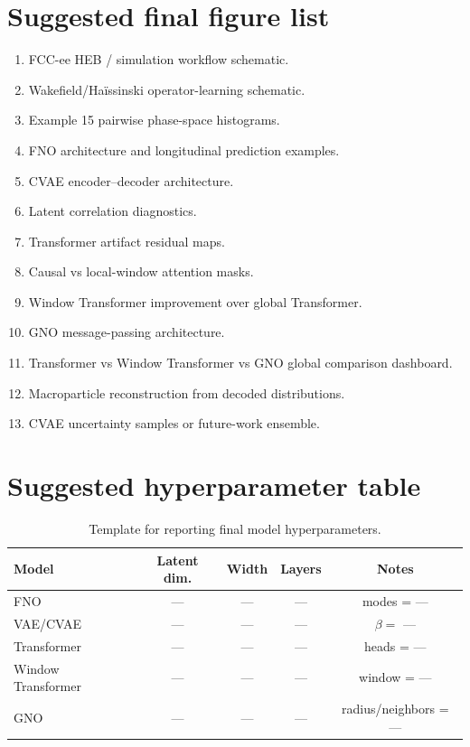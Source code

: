 \documentclass[11pt,a4paper]{article}
\begin{document}
\begin{sloppypar}
\section{Suggested final figure list}
\begin{enumerate}[label=Fig.~\arabic*:, leftmargin=2.2cm]
    \item FCC-ee HEB / simulation workflow schematic.
    \item Wakefield/Ha\"issinski operator-learning schematic.
    \item Example 15 pairwise phase-space histograms.
    \item FNO architecture and longitudinal prediction examples.
    \item CVAE encoder--decoder architecture.
    \item Latent correlation diagnostics.
    \item Transformer artifact residual maps.
    \item Causal vs local-window attention masks.
    \item Window Transformer improvement over global Transformer.
    \item GNO message-passing architecture.
    \item Transformer vs Window Transformer vs GNO global comparison dashboard.
    \item Macroparticle reconstruction from decoded distributions.
    \item CVAE uncertainty samples or future-work ensemble.
\end{enumerate}

\section{Suggested hyperparameter table}
\begin{table}[H]
\centering
\caption{Template for reporting final model hyperparameters.}
\label{tab:hyperparameters_appendix}
\begin{tabular}{lcccc}
\toprule
Model & Latent dim. & Width & Layers & Notes \\
\midrule
FNO & --- & --- & --- & modes = --- \\
VAE/CVAE & --- & --- & --- & $\beta=$ --- \\
Transformer & --- & --- & --- & heads = --- \\
Window Transformer & --- & --- & --- & window = --- \\
GNO & --- & --- & --- & radius/neighbors = --- \\
\bottomrule
\end{tabular}
\end{table}

\end{sloppypar}
\end{document}
